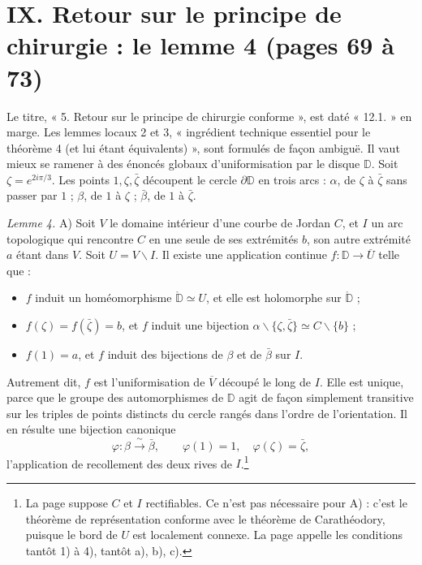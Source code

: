 \documentclass[11pt,a4paper]{article}
\begin{document}
\section*{IX. Retour sur le principe de chirurgie : le lemme 4 (pages 69 à 73)}

Le titre, « 5. Retour sur le principe de chirurgie conforme », est daté
« 12.1. » en marge. Les lemmes locaux 2 et 3, « ingrédient technique
essentiel pour le théorème 4 (et lui étant équivalents) », sont formulés de
façon ambiguë. Il vaut mieux se ramener à des énoncés globaux
d'uniformisation par le disque $\mathbb{D}$. Soit $\zeta = e^{2i\pi/3}$. Les
points $1, \zeta, \bar\zeta$ découpent le cercle $\partial\mathbb{D}$ en trois
arcs : $\alpha$, de $\zeta$ à $\bar\zeta$ sans passer par $1$ ; $\beta$, de
$1$ à $\zeta$ ; $\bar\beta$, de $1$ à $\bar\zeta$.

\emph{Lemme 4.} A) Soit $V$ le domaine intérieur d'une courbe de Jordan $C$,
et $I$ un arc topologique qui rencontre $C$ en une seule de ses extrémités
$b$, son autre extrémité $a$ étant dans $V$. Soit $U = V \smallsetminus I$.
Il existe une application continue $f : \mathbb{D} \to \overline{U}$ telle
que :
\begin{itemize}
  \item[1)] $f$ induit un homéomorphisme $\mathring{\mathbb{D}} \simeq U$, et
  elle est holomorphe sur $\mathring{\mathbb{D}}$ ;
  \item[2)] $f(\zeta) = f(\bar\zeta) = b$, et $f$ induit une bijection
  $\alpha \smallsetminus \{\zeta,\bar\zeta\} \simeq C \smallsetminus \{b\}$ ;
  \item[3)] $f(1) = a$, et $f$ induit des bijections de $\beta$ et de
  $\bar\beta$ sur $I$.
\end{itemize}
Autrement dit, $f$ est l'uniformisation de $\overline{V}$ découpé le long de
$I$. Elle est unique, parce que le groupe des automorphismes de $\mathbb{D}$
agit de façon simplement transitive sur les triples de points distincts du
cercle rangés dans l'ordre de l'orientation. Il en résulte une bijection
canonique
\[
\varphi : \beta \xrightarrow{\ \sim\ } \bar\beta, \qquad \varphi(1) = 1,
\quad \varphi(\zeta) = \bar\zeta,
\]
l'application de recollement des deux rives de $I$.\footnote{La page suppose
$C$ et $I$ rectifiables. Ce n'est pas nécessaire pour A) : c'est le théorème
de représentation conforme avec le théorème de Carathéodory, puisque le bord
de $U$ est localement connexe. La page appelle les conditions tantôt 1) à 4),
tantôt a), b), c).}
\end{document}

